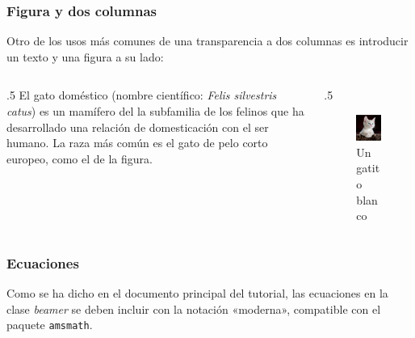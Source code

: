 \documentclass{beamer}
\begin{document}
    \begin{frame}
        \frametitle{Figura y dos columnas}
        Otro de los usos más comunes de una transparencia a dos columnas es
        introducir un texto y una figura a su lado:
        \begin{columns}
            \begin{column}{.5\hsize}
                El gato doméstico (nombre científico:
                \textit{Felis silvestris catus})
                es un mamífero del la subfamilia de los felinos que ha
                desarrollado una relación de domesticación con el ser humano.
                La raza más común es el gato de pelo corto europeo, como el
                de la figura.
            \end{column}
            \begin{column}{.5\hsize}
                \begin{figure}[H]
                    \includegraphics[width=.75\hsize]{gatito}
                    \caption{Un gatito blanco}
                    \label{fig:gatito}
                \end{figure}
            \end{column}
        \end{columns}
    \end{frame}
    \begin{frame}
        \frametitle{Ecuaciones}
        Como se ha dicho en el documento principal del tutorial, las
        ecuaciones en la clase \textit{beamer} se deben incluir con la notación
        «moderna», compatible con el paquete \texttt{amsmath}.
    \end{frame}
\end{document}
